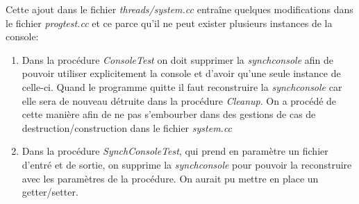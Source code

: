\documentclass[a4paper,10pt]{article}
\begin{document}
  Cette ajout dans le fichier \emph{threads/system.cc} entraîne quelques modifications dans le fichier \emph{progtest.cc} et ce parce qu'il ne peut exister
  plusieurs instances de la console:
    \begin{enumerate}
     \item Dans la procédure \emph{ConsoleTest} on doit supprimer la \emph{synchconsole} afin de pouvoir utiliser explicitement la console et d'avoir qu'une
     seule instance de celle-ci. Quand le programme quitte il faut reconstruire la \emph{synchconsole} car elle sera de nouveau détruite dans la procédure 
     \emph{Cleanup}. On a procédé de cette manière afin de ne pas s'embourber dans des gestions de cas de destruction/construction dans le fichier \emph{system.cc}
     \item Dans la procédure \emph{SynchConsoleTest}, qui prend en paramètre un fichier d'entré et de sortie, on supprime la \emph{synchconsole} pour pouvoir
     la reconstruire avec les paramètres de la procédure. On aurait pu mettre en place un getter/setter.
    \end{enumerate}
\end{document}
